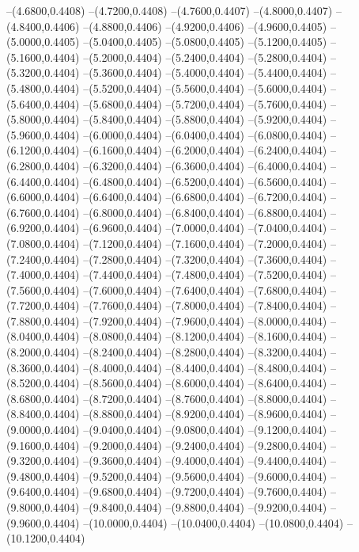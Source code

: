 {	--(4.6800,0.4408)
	--(4.7200,0.4408)
	--(4.7600,0.4407)
	--(4.8000,0.4407)
	--(4.8400,0.4406)
	--(4.8800,0.4406)
	--(4.9200,0.4406)
	--(4.9600,0.4405)
	--(5.0000,0.4405)
	--(5.0400,0.4405)
	--(5.0800,0.4405)
	--(5.1200,0.4405)
	--(5.1600,0.4404)
	--(5.2000,0.4404)
	--(5.2400,0.4404)
	--(5.2800,0.4404)
	--(5.3200,0.4404)
	--(5.3600,0.4404)
	--(5.4000,0.4404)
	--(5.4400,0.4404)
	--(5.4800,0.4404)
	--(5.5200,0.4404)
	--(5.5600,0.4404)
	--(5.6000,0.4404)
	--(5.6400,0.4404)
	--(5.6800,0.4404)
	--(5.7200,0.4404)
	--(5.7600,0.4404)
	--(5.8000,0.4404)
	--(5.8400,0.4404)
	--(5.8800,0.4404)
	--(5.9200,0.4404)
	--(5.9600,0.4404)
	--(6.0000,0.4404)
	--(6.0400,0.4404)
	--(6.0800,0.4404)
	--(6.1200,0.4404)
	--(6.1600,0.4404)
	--(6.2000,0.4404)
	--(6.2400,0.4404)
	--(6.2800,0.4404)
	--(6.3200,0.4404)
	--(6.3600,0.4404)
	--(6.4000,0.4404)
	--(6.4400,0.4404)
	--(6.4800,0.4404)
	--(6.5200,0.4404)
	--(6.5600,0.4404)
	--(6.6000,0.4404)
	--(6.6400,0.4404)
	--(6.6800,0.4404)
	--(6.7200,0.4404)
	--(6.7600,0.4404)
	--(6.8000,0.4404)
	--(6.8400,0.4404)
	--(6.8800,0.4404)
	--(6.9200,0.4404)
	--(6.9600,0.4404)
	--(7.0000,0.4404)
	--(7.0400,0.4404)
	--(7.0800,0.4404)
	--(7.1200,0.4404)
	--(7.1600,0.4404)
	--(7.2000,0.4404)
	--(7.2400,0.4404)
	--(7.2800,0.4404)
	--(7.3200,0.4404)
	--(7.3600,0.4404)
	--(7.4000,0.4404)
	--(7.4400,0.4404)
	--(7.4800,0.4404)
	--(7.5200,0.4404)
	--(7.5600,0.4404)
	--(7.6000,0.4404)
	--(7.6400,0.4404)
	--(7.6800,0.4404)
	--(7.7200,0.4404)
	--(7.7600,0.4404)
	--(7.8000,0.4404)
	--(7.8400,0.4404)
	--(7.8800,0.4404)
	--(7.9200,0.4404)
	--(7.9600,0.4404)
	--(8.0000,0.4404)
	--(8.0400,0.4404)
	--(8.0800,0.4404)
	--(8.1200,0.4404)
	--(8.1600,0.4404)
	--(8.2000,0.4404)
	--(8.2400,0.4404)
	--(8.2800,0.4404)
	--(8.3200,0.4404)
	--(8.3600,0.4404)
	--(8.4000,0.4404)
	--(8.4400,0.4404)
	--(8.4800,0.4404)
	--(8.5200,0.4404)
	--(8.5600,0.4404)
	--(8.6000,0.4404)
	--(8.6400,0.4404)
	--(8.6800,0.4404)
	--(8.7200,0.4404)
	--(8.7600,0.4404)
	--(8.8000,0.4404)
	--(8.8400,0.4404)
	--(8.8800,0.4404)
	--(8.9200,0.4404)
	--(8.9600,0.4404)
	--(9.0000,0.4404)
	--(9.0400,0.4404)
	--(9.0800,0.4404)
	--(9.1200,0.4404)
	--(9.1600,0.4404)
	--(9.2000,0.4404)
	--(9.2400,0.4404)
	--(9.2800,0.4404)
	--(9.3200,0.4404)
	--(9.3600,0.4404)
	--(9.4000,0.4404)
	--(9.4400,0.4404)
	--(9.4800,0.4404)
	--(9.5200,0.4404)
	--(9.5600,0.4404)
	--(9.6000,0.4404)
	--(9.6400,0.4404)
	--(9.6800,0.4404)
	--(9.7200,0.4404)
	--(9.7600,0.4404)
	--(9.8000,0.4404)
	--(9.8400,0.4404)
	--(9.8800,0.4404)
	--(9.9200,0.4404)
	--(9.9600,0.4404)
	--(10.0000,0.4404)
	--(10.0400,0.4404)
	--(10.0800,0.4404)
	--(10.1200,0.4404)
}
